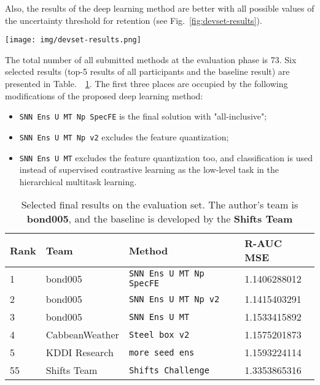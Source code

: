 \documentclass{article}
\begin{document}
Also, the results of the deep learning method are better with all possible values of the uncertainty threshold for retention (see Fig.~\ref{fig:devset-results}).

\begin{figure*}[hbt!]
 \centering
\begin{minipage}[h]{0.8\linewidth}
  \centering
  \centerline{\texttt{[image: img/devset-results.png]}}
  \vspace{-0.1cm}
\end{minipage}
 \caption{Error retention curves on the development set.}
 \label{fig:devset-results}
\end{figure*}

The total number of all submitted methods at the evaluation phase is 73. Six selected results (top-5 results of all participants and the baseline result) are presented in Table.~~\ref{tab:evalset-results}. The first three places are occupied by the following modifications of the proposed deep learning method:

\begin{itemize}
    \item \verb+SNN Ens U MT Np SpecFE+ is the final solution with "all-inclusive";
    \item \verb+SNN Ens U MT Np v2+ excludes the feature quantization;
    \item \verb+SNN Ens U MT+ excludes the feature quantization too, and classification is used instead of supervised contrastive learning as the low-level task in the hierarchical multitask learning.
\end{itemize}

\begin{table}[h!]
  \caption{Selected final results on the evaluation set. The author's team is \textbf{bond005}, and the baseline is developed by the \textbf{Shifts Team}}
  \label{tab:evalset-results}
  \centering
  \begin{tabular}{llll}
    \toprule
    Rank & Team    & Method                        & R-AUC MSE     \\
    \midrule
    1    & bond005 & \verb+SNN Ens U MT Np SpecFE+ & 1.1406288012  \\
    2    & bond005 & \verb+SNN Ens U MT Np v2+     & 1.1415403291  \\
    3    & bond005 & \verb+SNN Ens U MT+           & 1.1533415892  \\
    4    & CabbeanWeather & \verb+Steel box v2+    & 1.1575201873  \\
    5    & KDDI Research & \verb+more seed ens+    & 1.1593224114  \\
    55   & Shifts Team & \verb+Shifts Challenge+   & 1.3353865316  \\
    \bottomrule
  \end{tabular}
\end{table}
\end{document}
